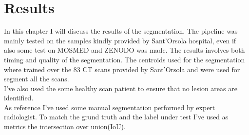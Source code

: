 \documentclass{standalone}
\begin{document}
	\chapter{Results}
	
	In this chapter I will discuss the results of the segmentation. The pipeline was mainly tested on the samples kindly provided by Sant'Orsola hospital, even if also some test on MOSMED and ZENODO was made. The results involves both timing and quality of the segmentation. The centroids used for the segmentation where trained over the 83 CT scans provided by Sant'Orsola and were used for segment all the scans.\\
	I've also used the some healthy scan patient to ensure that no lesion areas are identified.\\
	As reference I've used some manual segmentation performed by expert radiologist. To match the grund truth and the label under test I've used as metrics the intersection over union(IoU).\\ 
\end{document}
